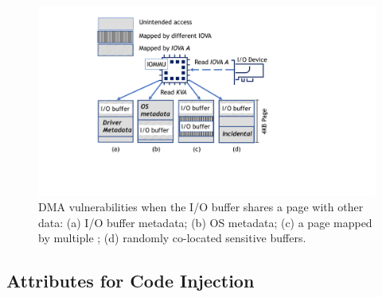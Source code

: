 \begin{figure}[t]
    \centering
    \includegraphics[width=0.8\columnwidth]{figs/subpage.pdf}
    \caption{\subpage{} DMA vulnerabilities when the I/O buffer shares a page with other data: (a) I/O buffer metadata; (b) OS
metadata; (c) a page mapped by multiple \iova; (d) randomly co-located sensitive buffers.}
    \label{fig:colocation}
\end{figure}




\subsection{\DIFdelbegin {}\DIFdelend \DIFaddbegin {}\DIFaddend Attributes for Code Injection}\label{sec:mmo}

